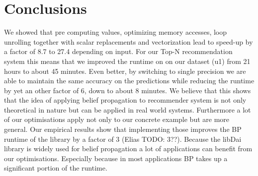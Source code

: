 \section{Conclusions}
We showed that pre computing values, optimizing memory accesses, loop unrolling together with scalar replacements and vectorization lead to speed-up by a factor of 8.7 to 27.4 depending on input. For our Top-N recommendation system this means that we improved the runtime on on our dataset (u1) from 21 hours to about 45 minutes. Even better, by switching to single precision we are able to maintain the same accuracy on the predictions while reducing the runtime by yet an other factor of 6, down to about 8 minutes. We believe that this shows that the idea of applying belief propagation to recommender system is not only theoretical in nature but can be applied in real world systems. Furthermore a lot of our optimisations apply not only to our concrete example but are more general. Our empirical results show that implementing those improves the BP runtime of the library by a factor of 3 (Elias TODO: 3??). Because the libDai library is widely used for belief propagation a lot of applications can benefit from our optimisations. Especially because in most applications BP takes up a significant portion of the runtime.